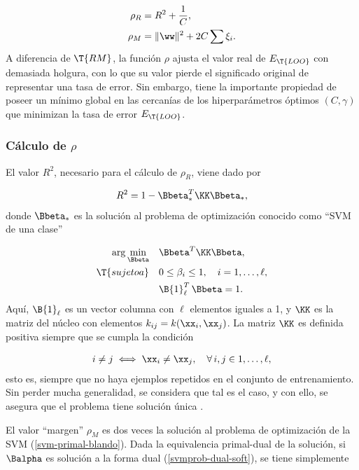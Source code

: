 \begin{align}
  \rho_R &= R^2+\frac{1}{C}, \\
  \rho_M &= \|\ww\|^2+2C\sum\xi_i.
\end{align}
A diferencia de $\T{RM}$, la función $\rho$ ajusta el valor
real de $E_{\T{LOO}}$ con demasiada holgura, con lo que su valor
pierde el significado original de representar una tasa de error. Sin
embargo, tiene la importante propiedad de poseer un mínimo global en
las cercanías de los hiperparámetros óptimos $(C,\gamma)$ que
minimizan la tasa de error $E_{\T{LOO}}$.

\subsubsection{Cálculo de $\rho$}
El valor $R^2$, necesario para el cálculo de $\rho_R$, viene dado por

\begin{align}
  R^2 = 1 - \Bbeta_*^T \KK \Bbeta_*,
\end{align}
donde $\Bbeta_*$ es la solución al problema de optimización conocido
como ``SVM de una clase'' \cite{scholkopf}

\begin{align}
\begin{split}
  \arg\min_{\Bbeta}\quad&\Bbeta^T \KK \Bbeta,\\
  \T{sujeto a}    \quad&0\leq\beta_i\leq{}1,\quad{}i=1,\ldots,\ell,\\
                       &\B{1}^T_\ell\,\Bbeta=1.
  \end{split}
  \label{svm-oneclass}
\end{align}
Aquí, $\B{1}_{\ell}$ es un vector columna con $\ell$ elementos iguales
a 1, y $\KK$ es la matriz del núcleo con elementos
$k_{ij}=k(\xx_i,\xx_j)$. La matriz $\KK$ es definida positiva siempre
que se cumpla la condición

\begin{align}
\label{cond-kmatrix-defpos}
  i\neq j \iff \xx_i\neq\xx_j,\quad \forall\,i,j\in{1,\ldots,\ell},
\end{align}
esto es, siempre que no haya ejemplos repetidos en el conjunto de
entrenamiento. Sin perder mucha generalidad, se considera que tal es
el caso, y con ello, se asegura que el problema \cite{svm-oneclass}
tiene solución única \cite{SOL-UNICA-DEFINIDA-POSITIVA}.

El valor ``margen'' $\rho_M$ es dos veces la solución al problema de
optimización de la SVM (\autoref{svm-primal-blando}).  Dada la
equivalencia primal-dual de la solución, si $\Balpha$ es solución a
la forma dual (\autoref{svmprob-dual-soft}), se tiene simplemente

